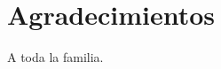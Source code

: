\documentclass[a4paper,11pt,twoside]{ThesisStyle}
\begin{document}


\dominitoc


 \cleardoublepage

\section*{Agradecimientos}

 A toda la familia.

\tableofcontents

\mainmatter










\appendix






\end{document}
